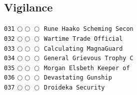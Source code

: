 \documentclass[a4paper,landscape]{article}
\begin{document}
\begin{multicols*}{5}
\section{Vigilance} 
\vspace{-2mm} 
\texttt{031} \(\bigcirc\!\bigcirc\!\bigcirc\)  \texttt{Rune Haako Scheming Secon} \vspace{-0.3mm}\\ 
\texttt{032} \(\bigcirc\!\bigcirc\!\bigcirc\)  \texttt{Wartime Trade Official} \vspace{-0.3mm}\\ 
\texttt{033} \(\bigcirc\!\bigcirc\!\bigcirc\)  \texttt{Calculating MagnaGuard} \vspace{-0.3mm}\\ 
\texttt{034} \(\bigcirc\!\bigcirc\!\bigcirc\)  \texttt{General Grievous Trophy C} \vspace{-0.3mm}\\ 
\texttt{035} \(\bigcirc\!\bigcirc\!\bigcirc\)  \texttt{Morgan Elsbeth Keeper of } \vspace{-0.3mm}\\ 
\texttt{036} \(\bigcirc\!\bigcirc\!\bigcirc\)  \texttt{Devastating Gunship} \vspace{-0.3mm}\\ 
\texttt{037} \(\bigcirc\!\bigcirc\!\bigcirc\)  \texttt{Droideka Security} \vspace{-0.3mm}\\ 

\end{multicols*}
\end{document}
